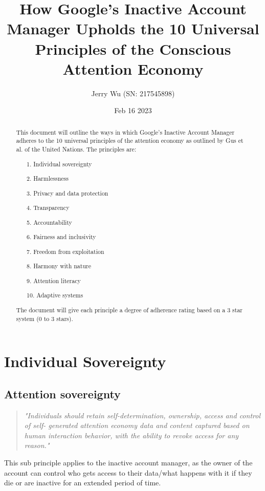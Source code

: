 \documentclass[12pt]{article}
\title{How Google's Inactive Account Manager Upholds the 10 Universal Principles of the Conscious Attention Economy}
\author{Jerry Wu (SN: 217545898)}
\date{Feb 16 2023}
\begin{document}
\maketitle
\tableofcontents

\begin{abstract}
    This document will outline the ways in which Google's Inactive Account Manager adheres to the 10 universal principles of the attention economy as outlined by Gus et al. of the United Nations. The principles are:

    \begin{itemize}
        \item[1.] Individual sovereignty
        \item[2.] Harmlessness
        \item[3.] Privacy and data protection
        \item[4.] Transparency
        \item[5.] Accountability
        \item[6.] Fairness and inclusivity
        \item[7.] Freedom from exploitation
        \item[8.] Harmony with nature
        \item[9.] Attention literacy
        \item[10.] Adaptive systems
    \end{itemize}

    The document will give each principle a degree of adherence rating based on a 3 star system (0 to 3 stars).

\end{abstract}

\section{Individual Sovereignty}
    \subsection{Attention sovereignty}
        \begin{quote}
            \textit{"Individuals should retain self-determination, ownership, access and control of self-
            generated attention economy data and content captured based on human interaction
            behavior, with the ability to revoke access for any reason."}
        \end{quote}
        
        This sub principle applies to the inactive account manager, as the owner of the account can control who gets access to their data/what happens with it if they die or are inactive for an extended period of time.
\end{document}
